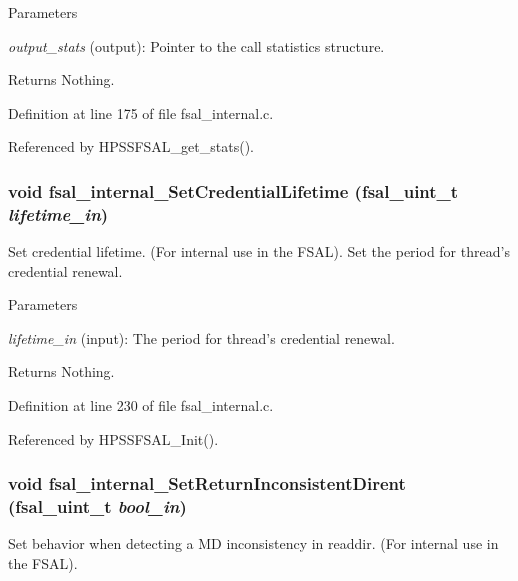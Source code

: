 \begin{DoxyParams}{Parameters}
\item[{\em output\_\-stats}](output): Pointer to the call statistics structure.\end{DoxyParams}
\begin{DoxyReturn}{Returns}
Nothing. 
\end{DoxyReturn}


Definition at line 175 of file fsal\_\-internal.c.

Referenced by HPSSFSAL\_\-get\_\-stats().
\subsubsection[{fsal\_\-internal\_\-SetCredentialLifetime}]{\setlength{\rightskip}{0pt plus 5cm}void fsal\_\-internal\_\-SetCredentialLifetime (fsal\_\-uint\_\-t {\em lifetime\_\-in})}\label{fsal__internal_8c_a52fbd60f6f8f222868f133a1ca585bd1}
Set credential lifetime. (For internal use in the FSAL). Set the period for thread's credential renewal.


\begin{DoxyParams}{Parameters}
\item[{\em lifetime\_\-in}](input): The period for thread's credential renewal.\end{DoxyParams}
\begin{DoxyReturn}{Returns}
Nothing. 
\end{DoxyReturn}


Definition at line 230 of file fsal\_\-internal.c.

Referenced by HPSSFSAL\_\-Init().
\subsubsection[{fsal\_\-internal\_\-SetReturnInconsistentDirent}]{\setlength{\rightskip}{0pt plus 5cm}void fsal\_\-internal\_\-SetReturnInconsistentDirent (fsal\_\-uint\_\-t {\em bool\_\-in})}\label{fsal__internal_8c_ac9a6a99ea408b452eb6f232ae3ed5271}
Set behavior when detecting a MD inconsistency in readdir. (For internal use in the FSAL).


